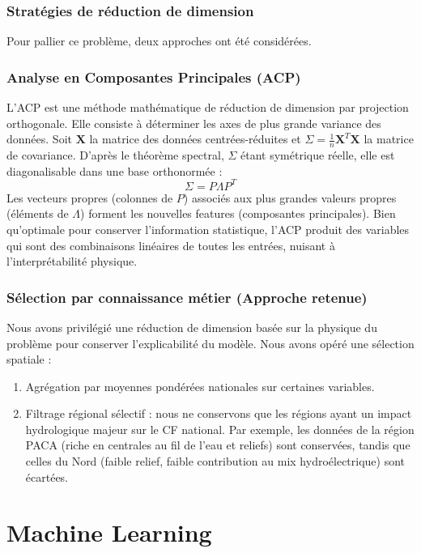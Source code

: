 \documentclass{article}
\theoremstyle{nopointbreak}
\theoremstyle{nobrkbold}
\begin{document}
\subsubsection{Stratégies de réduction de dimension}

Pour pallier ce problème, deux approches ont été considérées.

\subsubsection*{Analyse en Composantes Principales (ACP)}
L'ACP est une méthode mathématique de réduction de dimension par projection orthogonale. Elle consiste à déterminer les axes de plus grande variance des données.
Soit $\mathbf{X}$ la matrice des données centrées-réduites et $\Sigma = \frac{1}{n}\mathbf{X}^T\mathbf{X}$ la matrice de covariance.
D'après le théorème spectral, $\Sigma$ étant symétrique réelle, elle est diagonalisable dans une base orthonormée :
\[ \Sigma = P \Lambda P^T \]
Les vecteurs propres (colonnes de $P$) associés aux plus grandes valeurs propres (éléments de $\Lambda$) forment les nouvelles features (composantes principales). Bien qu'optimale pour conserver l'information statistique, l'ACP produit des variables qui sont des combinaisons linéaires de toutes les entrées, nuisant à l'interprétabilité physique.

\subsubsection*{Sélection par connaissance métier (Approche retenue)}
Nous avons privilégié une réduction de dimension basée sur la physique du problème pour conserver l'explicabilité du modèle.
Nous avons opéré une sélection spatiale :
\begin{enumerate}
    \item Agrégation par moyennes pondérées nationales sur certaines variables.
    \item Filtrage régional sélectif : nous ne conservons que les régions ayant un impact hydrologique majeur sur le CF national. Par exemple, les données de la région PACA (riche en centrales au fil de l'eau et reliefs) sont conservées, tandis que celles du Nord (faible relief, faible contribution au mix hydroélectrique) sont écartées.
\end{enumerate}

\newpage
\section{Machine Learning}
\end{document}
